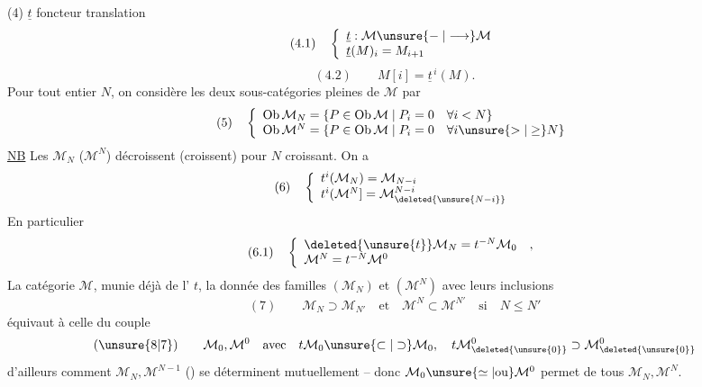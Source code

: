 (4) $\underline t$ foncteur translation
\[
(4.1)\quad\left\{\begin{array}{l}
\underline t:\mathcal M\unsure{\mathrel{-}|\longrightarrow}\mathcal M\\
\underline t(M)_i=M_{i+1}
\end{array}\right.
\]
\[
(4.2)\qquad M[i]=\underline t^{\,i}(M).
\]
Pour tout entier $N$, on considère les deux sous-catégories  pleines  de $\mathcal M$  par
\[
(5)\quad\left\{\begin{array}{l}
\operatorname{Ob}\mathcal M_N=\{P\in\operatorname{Ob}\mathcal M\mid P_i=0\quad\forall i<N\}\\
\operatorname{Ob}\mathcal M^N=\{P\in\operatorname{Ob}\mathcal M\mid P_i=0\quad\forall i\unsure{>|\geq}N\}
\end{array}\right.
\]
\uline{NB} Les $\mathcal M_N$ ($\mathcal M^N$) décroissent (croissent) pour $N$ croissant. On a
\[
(6)\quad\left\{\begin{array}{l}
t^i(\mathcal M_N)=\mathcal M_{N-i}\\
t^i(\mathcal M^N]=\mathcal M^{N-i}_{\deleted{\unsure{N-i}}}
\end{array}\right.
\]
En particulier 
\[
(6.1)\quad\left\{\begin{array}{l}
\deleted{\unsure{t}}\mathcal M_N=t^{-N}\mathcal M_0\quad,\\
\mathcal M^N=t^{-N}\mathcal M^0
\end{array}\right.
\]
 La catégorie $\mathcal M$, munie déjà de l' $t$, la donnée des familles $(\mathcal M_N)$ et $(\mathcal M^N)$ avec leurs inclusions 
\[
(7)\qquad\mathcal M_N\supset\mathcal M_{N'}\quad\text{et}\quad\mathcal M^N\subset\mathcal M^{N'}\quad\text{si}\quad N\leq N'
\]
équivaut à celle  du couple
\[
(\unsure{8|7})\qquad\mathcal M_0,\mathcal M^0\quad\text{avec}\quad t\mathcal M_0\unsure{\subset|\supset}\mathcal M_0,\quad
 t\mathcal M^0_{\deleted{\unsure{0}}}\supset\mathcal M^0_{\deleted{\unsure{0}}}
\]
 d'ailleurs comment $\mathcal M_N,\mathcal M^{N-1}$ () se déterminent mutuellement -- donc $\mathcal M_0\unsure{\simeq|\text{ou}}\mathcal M^0$ permet de  tous  $\mathcal M_N,\mathcal M^N$.

